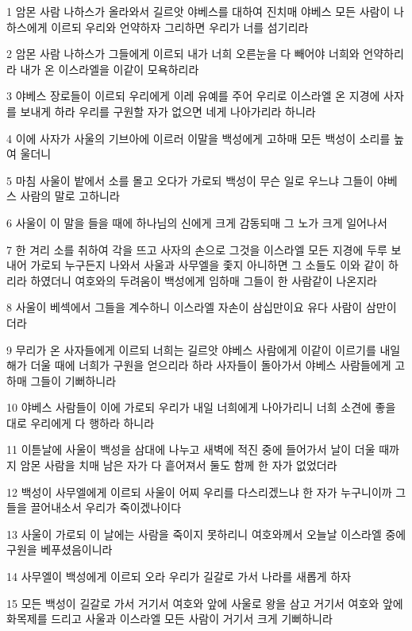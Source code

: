 \par 1 암몬 사람 나하스가 올라와서 길르앗 야베스를 대하여 진치매 야베스 모든 사람이 나하스에게 이르되 우리와 언약하자 그리하면 우리가 너를 섬기리라
\par 2 암몬 사람 나하스가 그들에게 이르되 내가 너희 오른눈을 다 빼어야 너희와 언약하리라 내가 온 이스라엘을 이같이 모욕하리라
\par 3 야베스 장로들이 이르되 우리에게 이레 유예를 주어 우리로 이스라엘 온 지경에 사자를 보내게 하라 우리를 구원할 자가 없으면 네게 나아가리라 하니라
\par 4 이에 사자가 사울의 기브아에 이르러 이말을 백성에게 고하매 모든 백성이 소리를 높여 울더니
\par 5 마침 사울이 밭에서 소를 몰고 오다가 가로되 백성이 무슨 일로 우느냐 그들이 야베스 사람의 말로 고하니라
\par 6 사울이 이 말을 들을 때에 하나님의 신에게 크게 감동되매 그 노가 크게 일어나서
\par 7 한 겨리 소를 취하여 각을 뜨고 사자의 손으로 그것을 이스라엘 모든 지경에 두루 보내어 가로되 누구든지 나와서 사울과 사무엘을 좇지 아니하면 그 소들도 이와 같이 하리라 하였더니 여호와의 두려움이 백성에게 임하매 그들이 한 사람같이 나온지라
\par 8 사울이 베섹에서 그들을 계수하니 이스라엘 자손이 삼십만이요 유다 사람이 삼만이더라
\par 9 무리가 온 사자들에게 이르되 너희는 길르앗 야베스 사람에게 이같이 이르기를 내일 해가 더울 때에 너희가 구원을 얻으리라 하라 사자들이 돌아가서 야베스 사람들에게 고하매 그들이 기뻐하니라
\par 10 야베스 사람들이 이에 가로되 우리가 내일 너희에게 나아가리니 너희 소견에 좋을 대로 우리에게 다 행하라 하니라
\par 11 이튿날에 사울이 백성을 삼대에 나누고 새벽에 적진 중에 들어가서 날이 더울 때까지 암몬 사람을 치매 남은 자가 다 흩어져서 둘도 함께 한 자가 없었더라
\par 12 백성이 사무엘에게 이르되 사울이 어찌 우리를 다스리겠느냐 한 자가 누구니이까 그들을 끌어내소서 우리가 죽이겠나이다
\par 13 사울이 가로되 이 날에는 사람을 죽이지 못하리니 여호와께서 오늘날 이스라엘 중에 구원을 베푸셨음이니라
\par 14 사무엘이 백성에게 이르되 오라 우리가 길갈로 가서 나라를 새롭게 하자
\par 15 모든 백성이 길갈로 가서 거기서 여호와 앞에 사울로 왕을 삼고 거기서 여호와 앞에 화목제를 드리고 사울과 이스라엘 모든 사람이 거기서 크게 기뻐하니라

